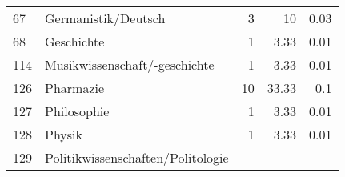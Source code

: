 \begin{longtable}{lXrrr}
     67 &
     \multicolumn{1}{X}{ Germanistik/Deutsch   } &


       \num{3} &
       \num[round-mode=places,round-precision=2]{10} &
         \num[round-mode=places,round-precision=2]{0,03} \\

     68 &
     \multicolumn{1}{X}{ Geschichte   } &


       \num{1} &
       \num[round-mode=places,round-precision=2]{3,33} &
         \num[round-mode=places,round-precision=2]{0,01} \\

     114 &
     \multicolumn{1}{X}{ Musikwissenschaft/-geschichte   } &


       \num{1} &
       \num[round-mode=places,round-precision=2]{3,33} &
         \num[round-mode=places,round-precision=2]{0,01} \\

     126 &
     \multicolumn{1}{X}{ Pharmazie   } &


       \num{10} &
       \num[round-mode=places,round-precision=2]{33,33} &
         \num[round-mode=places,round-precision=2]{0,1} \\

     127 &
     \multicolumn{1}{X}{ Philosophie   } &


       \num{1} &
       \num[round-mode=places,round-precision=2]{3,33} &
         \num[round-mode=places,round-precision=2]{0,01} \\

     128 &
     \multicolumn{1}{X}{ Physik   } &


       \num{1} &
       \num[round-mode=places,round-precision=2]{3,33} &
         \num[round-mode=places,round-precision=2]{0,01} \\

     129 &
     \multicolumn{1}{X}{ Politikwissenschaften/Politologie   } &



\end{longtable}
